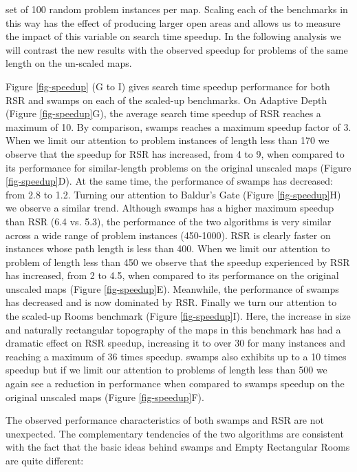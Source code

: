 set of 100 random problem instances per map.
Scaling each of the benchmarks in this way has the effect of producing larger open areas and allows 
us to measure the impact of this variable on search time speedup.
In the following analysis we will contrast the new
results with the observed speedup for problems of the same length on the un-scaled maps.
\par
Figure \ref{fig-speedup} (G to I) gives search time speedup performance for both RSR and swamps
on each of the scaled-up benchmarks.
On Adaptive Depth (Figure \ref{fig-speedup}G), the average search time speedup of RSR reaches a maximum of 10. 
By comparison, swamps reaches a maximum speedup factor of 3.
When we limit our attention to problem instances of length less than 170 we observe that the speedup 
for RSR has increased, from 4 to 9, when compared to its performance for similar-length problems on the original 
unscaled maps (Figure \ref{fig-speedup}D). 
At the same time, the performance of swamps has decreased: from 2.8 to 1.2.
Turning our attention to Baldur's Gate (Figure \ref{fig-speedup}H) we observe a similar trend.
Although swamps has a higher maximum speedup than RSR (6.4 vs. 5.3), the performance of the two 
algorithms is very similar across a wide range of problem instances (450-1000).
RSR is clearly faster on instances whose path length is less than 400.
When we limit our attention to problem of length less than 450 we observe that the speedup experienced by
RSR has increased, from 2 to 4.5, when compared to its performance on the original unscaled maps
(Figure \ref{fig-speedup}E).
Meanwhile, the performance of swamps has decreased and is now dominated by RSR.
Finally we turn our attention to the scaled-up Rooms benchmark (Figure \ref{fig-speedup}I).
Here, the increase in size and naturally rectangular topography of the maps in this benchmark
has had a dramatic effect on RSR speedup, increasing it to over 30 for many
instances and reaching a maximum of 36 times speedup.
swamps also exhibits up to a 10 times speedup but if we limit our attention to problems of
length less than 500 we again see a reduction in performance when compared to swamps speedup
on the original unscaled maps (Figure \ref{fig-speedup}F). 
\par
The observed performance characteristics of both swamps and RSR
are not unexpected.
The complementary tendencies of the two algorithms
are consistent with the fact that 
the basic ideas behind swamps and Empty Rectangular Rooms are quite different:
